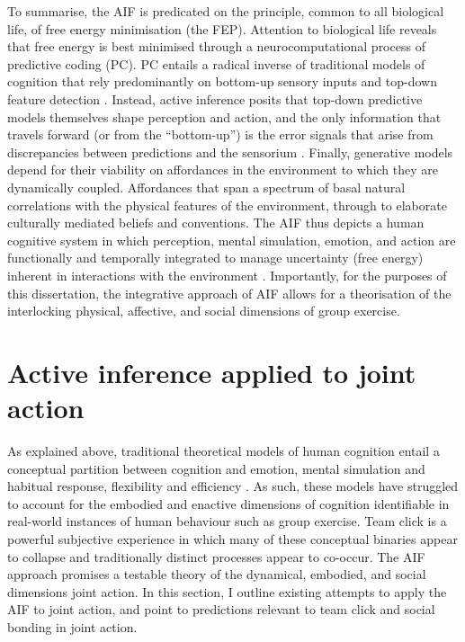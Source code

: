 \begin{CJK}{UTF8}{gbsn}
To summarise, the AIF is predicated on the principle, common to all biological life, of free energy minimisation (the FEP).   Attention to biological life reveals that free energy is best minimised through a neurocomputational process of predictive coding (PC). PC entails a radical inverse of traditional models of cognition that rely predominantly on bottom-up sensory inputs and top-down feature detection \citep[e.g.,][]{Marr1985}. Instead, active inference posits that top-down predictive models themselves shape perception and action, and the only information that travels forward (or from the ``bottom-up'') is the error signals that arise from discrepancies between predictions and the sensorium \citep{Pickering2014}.  Finally, generative models depend for their viability on affordances in the environment to which they are dynamically coupled.  Affordances that span a spectrum of basal natural correlations with the physical features of the environment, through to elaborate culturally mediated beliefs and conventions.  The AIF thus depicts a human cognitive system in which perception, mental simulation, emotion, and action are functionally and temporally integrated to manage uncertainty (free energy) inherent in interactions with the environment \citep{Clark2013}.  Importantly, for the purposes of this dissertation, the integrative approach of AIF allows for a theorisation of the interlocking physical, affective, and social dimensions of group exercise.











\section{Active inference applied to joint action \label{sect:activeInfJA}}
As explained above, traditional theoretical models of human cognition entail a conceptual partition between cognition and emotion, mental simulation and habitual response, flexibility and efficiency \citep{Clark2015}.  As such, these models have struggled to account for the embodied and enactive dimensions of cognition identifiable in real-world instances of human behaviour such as group exercise.  Team click is a powerful subjective experience in which many of these conceptual binaries appear to collapse and traditionally distinct processes appear to co-occur.  The AIF approach promises a testable theory of the dynamical, embodied, and social dimensions joint action.  In this section, I outline existing attempts to apply the AIF to joint action, and point to predictions relevant to team click and social bonding in joint action.


\end{CJK}

